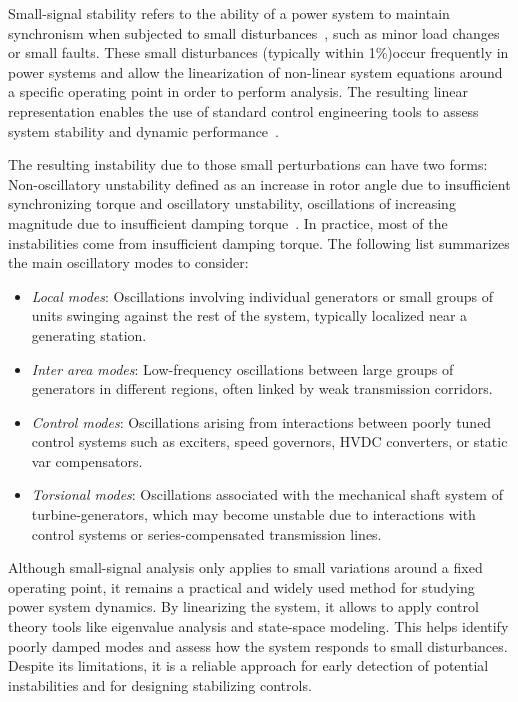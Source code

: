 Small-signal stability refers to the ability of a power system to maintain synchronism when subjected to 
small disturbances~\cite{StabilityAndControlKundur}, such as minor load changes or small faults. These small disturbances
(typically within 1\%)occur frequently in power systems and allow the linearization of non-linear system equations
 around a specific operating point in order to perform analysis. The resulting linear representation enables the use
  of standard control engineering tools to assess system stability and dynamic performance~\cite{SmallSignalCheah}.

The resulting instability due to those small perturbations can have two forms: Non-oscillatory unstability defined as an 
increase in rotor angle due to insufficient synchronizing torque and oscillatory unstability, oscillations of 
increasing magnitude due to insufficient damping torque~\cite{StabilityAndControlKundur}. In practice, most of the 
instabilities come from insufficient damping torque. The following list summarizes the main oscillatory modes to consider:

\begin{itemize}
    \item \textit{Local modes}: Oscillations involving individual generators or small groups of units swinging 
    against the rest of the system, typically localized near a generating station.
    \item \textit{Inter area modes}: Low-frequency oscillations between large groups of generators in different 
    regions, often linked by weak transmission corridors.
    \item \textit{Control modes}: Oscillations arising from interactions between poorly tuned control systems such 
    as exciters, speed governors, HVDC converters, or static var compensators.
    \item \textit{Torsional modes}: Oscillations associated with the mechanical shaft system of turbine-generators,
    which may become unstable due to interactions with control systems or series-compensated transmission lines.
\end{itemize}


Although small-signal analysis only applies to small variations around a fixed operating point, 
it remains a practical and widely used method for studying power system dynamics. By linearizing the system,
it allows to apply control theory tools like eigenvalue analysis and state-space modeling. 
This helps identify poorly damped modes and assess how the system responds to small disturbances. Despite its limitations,
it is a reliable approach for early detection of potential instabilities and for designing stabilizing controls.



